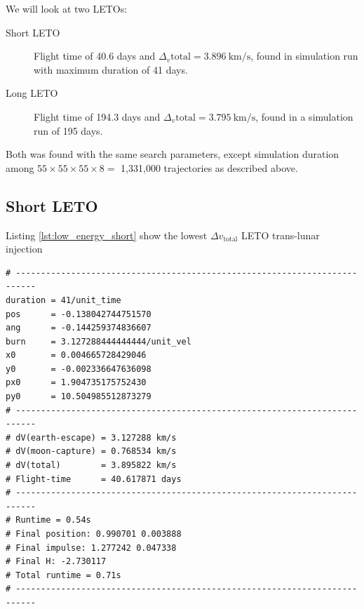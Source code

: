 We will look at two LETOs:
\begin{description}
    \item[Short LETO] Flight time of 40.6 days and $\Delta_v{\text{total}} = \SI{3.896}{\km\per\s}$, found in simulation run with maximum duration of 41 days.
    \item[Long LETO] Flight time of 194.3 days and $\Delta_v{\text{total}} = \SI{3.795}{\km\per\s}$, found in a simulation run of 195 days.
\end{description}
Both was found with the same search parameters, except simulation duration among $55 \times 55 \times 55 \times 8 =$ 1,331,000 trajectories as described above.


\subsection{Short LETO}
Listing \ref{lst:low_energy_short} show the lowest $\Delta v_{\text{total}}$ LETO trans-lunar injection 

\begin{adjustwidth*}{0cm}{-0.4cm}
\begin{lstlisting}[caption={Short LETO. \texttt{pos} = angular difference with start angle (here $\theta=-3\pi/4$), \texttt{ang} = angle to velocity vector in Earth parking orbit, \texttt{burn} = $\Delta v_{\text{earth}}$, \texttt{(x0,y0,px0,py0)} are the initial conditions.},label=lst:low_energy_short]
# --------------------------------------------------------------------------
duration = 41/unit_time
pos      = -0.138042744751570
ang      = -0.144259374836607
burn     = 3.127288444444444/unit_vel
x0       = 0.004665728429046
y0       = -0.002336647636098
px0      = 1.904735175752430
py0      = 10.504985512873279
# --------------------------------------------------------------------------
# dV(earth-escape) = 3.127288 km/s
# dV(moon-capture) = 0.768534 km/s
# dV(total)        = 3.895822 km/s
# Flight-time      = 40.617871 days
# --------------------------------------------------------------------------
# Runtime = 0.54s
# Final position: 0.990701 0.003888
# Final impulse: 1.277242 0.047338
# Final H: -2.730117
# Total runtime = 0.71s
# --------------------------------------------------------------------------
\end{lstlisting}
\end{adjustwidth*}

